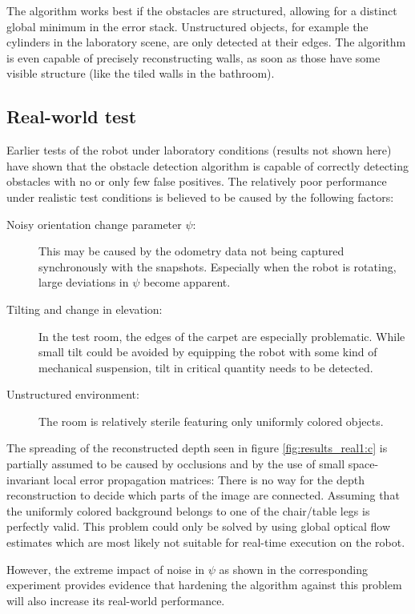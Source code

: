 The algorithm works best if the obstacles are structured, allowing for a distinct global minimum in the error stack. Unstructured objects, for example the cylinders in the laboratory scene, are only detected at their edges. The algorithm is even capable of precisely reconstructing walls, as soon as those have some visible structure (like the tiled walls in the bathroom).

\subsection{Real-world test}

Earlier tests of the robot under laboratory conditions (results not shown here) have shown that the obstacle detection algorithm is capable of correctly detecting obstacles with no or only few false positives. The relatively poor performance under realistic test conditions is believed to be caused by the following factors:
\begin{description}
 \item[Noisy orientation change parameter $\psi$:] This may be caused by the odometry data not being captured synchronously with the snapshots. Especially when the robot is rotating, large deviations in $\psi$ become apparent.
 \item[Tilting and change in elevation:] In the test room, the edges of the carpet are especially problematic. While small tilt could be avoided by equipping the robot with some kind of mechanical suspension, tilt in critical quantity needs to be detected.
 \item[Unstructured environment:] The room is relatively sterile featuring only uniformly colored objects.
\end{description}

The spreading of the reconstructed depth seen in figure \ref{fig:results_real1:c} is partially assumed to be caused by occlusions and by the use of small space-invariant local error propagation matrices: There is no way for the depth reconstruction to decide which parts of the image are connected. Assuming that the uniformly colored background belongs to one of the chair/table legs is perfectly valid. This problem could only be solved by using global optical flow estimates \citep{totalVariation,flowchapter05} which are most likely not suitable for real-time execution on the robot.

However, the extreme impact of noise in $\psi$ as shown in the corresponding experiment provides evidence that hardening the algorithm against this problem will also increase its real-world performance.

